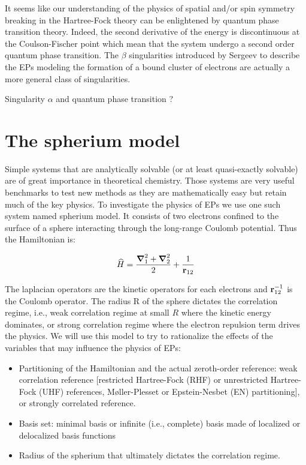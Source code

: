 \documentclass[11pt,a4paper]{article}
\begin{document}
{It seems like our understanding of the physics of spatial and/or spin symmetry breaking in the Hartree-Fock theory can be enlightened by quantum phase transition theory. Indeed, the second derivative of the energy is discontinuous at the Coulson-Fischer point which mean that the system undergo a second order quantum phase transition. The $\beta$ singularities introduced by Sergeev to describe the EPs modeling the formation of a bound cluster of electrons are actually a more general class of singularities.

Singularity $\alpha$ and quantum phase transition ?

\section{The spherium model}

Simple systems that are analytically solvable (or at least quasi-exactly solvable) are of great importance in theoretical chemistry. Those systems are very useful benchmarks to test new methods as they are mathematically easy but retain much of the key physics. To investigate the physics of EPs we use one such system named spherium model. It consists of two electrons confined to the surface of a sphere interacting through the long-range Coulomb potential. Thus the Hamiltonian is:

\begin{equation}
\widehat{H} = \frac{\grad_1^2 + \grad_2^2}{2} + \frac{1}{\vb{r}_{12}}
\end{equation}

The laplacian operators are the kinetic operators for each electrons and $\vb{r}_{12}^{-1}$ is the Coulomb operator. The radius R of the sphere dictates the correlation regime, i.e., weak correlation regime at small $R$ where the kinetic energy dominates, or strong correlation regime where the electron repulsion term drives the physics. We will use this model to try to rationalize the effects of the variables that may influence the physics of EPs:
\begin{itemize}
	\item Partitioning of the Hamiltonian and the actual zeroth-order reference: weak correlation reference [restricted Hartree-Fock (RHF) or unrestricted Hartree-Fock (UHF) references, M{\o}ller-Plesset or Epstein-Nesbet (EN) partitioning], or strongly correlated reference.
	\item Basis set: minimal basis or infinite (i.e., complete) basis made of localized or delocalized basis functions
	\item Radius of the spherium that ultimately dictates the correlation regime.
\end{itemize}

}
\end{document}
